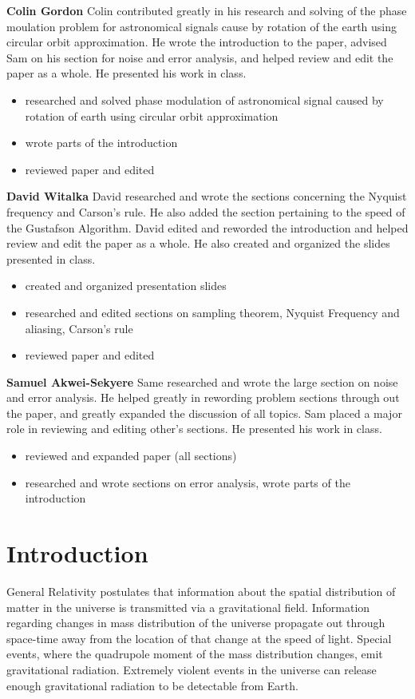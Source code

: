 \documentclass[onecolumn, groupedaddress, 10pt]{revtex4-1}
\begin{document}
\textbf{Colin Gordon}
Colin contributed greatly in his research and solving of the phase moulation problem for astronomical signals cause by rotation of the earth using circular orbit approximation. He wrote the introduction to the paper, advised Sam on his section for noise and error analysis, and helped review and edit the paper as a whole. He presented his work in class.
\begin{itemize}
\item researched and solved phase modulation of astronomical signal caused by rotation of earth using circular orbit approximation
\item wrote parts of the introduction
\item reviewed paper and edited
\end{itemize}

\textbf{David Witalka}
David researched and wrote the sections concerning the Nyquist frequency and Carson's rule. He also added the section pertaining to the speed of the Gustafson Algorithm. David edited and reworded the introduction and helped review and edit the paper as a whole. He also created and organized the slides presented in class.
\begin{itemize}
\item created and organized presentation slides
\item researched and edited sections on sampling theorem, Nyquist Frequency and aliasing, Carson’s rule
\item reviewed paper and edited
\end{itemize}

\textbf{Samuel Akwei-Sekyere}
Same researched and wrote the large section on noise and error analysis. He helped greatly in rewording problem sections through out the paper, and greatly expanded the discussion of all topics. Sam placed a major role in reviewing and editing other's sections. He presented his work in class.
\begin{itemize}
\item reviewed and expanded paper (all sections)
\item researched and wrote sections on error analysis, wrote parts of the introduction
\end{itemize}

\pagebreak


\section{Introduction}
General Relativity postulates that information about the spatial distribution of matter in the universe is transmitted via a gravitational field.  Information regarding changes in mass distribution of the universe propagate out through space-time away from the location of that change at the speed of light.  Special events, where the quadrupole moment of the mass distribution changes, emit gravitational radiation.  Extremely violent events in the universe can release enough gravitational radiation to be detectable from Earth.
\end{document}

